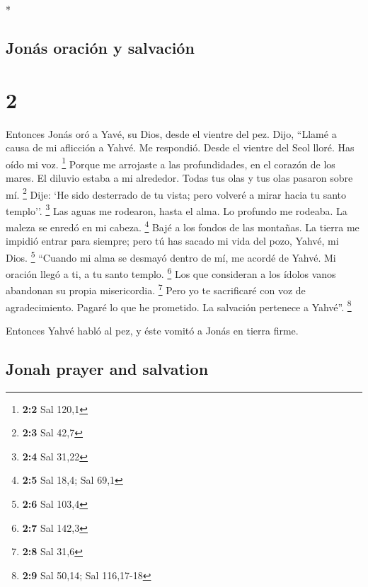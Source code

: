 \begin{paracol}{2}
\begin{otherlanguage}{english}
\end{otherlanguage}

\switchcolumn[0]*

\hypertarget{jonuxe1s-oraciuxf3n-y-salvaciuxf3n}{%
\subsection{Jonás oración y
salvación}\label{jonuxe1s-oraciuxf3n-y-salvaciuxf3n}}

\hypertarget{section-2}{%
\section{2}\label{section-2}}

 Entonces Jonás oró a Yavé, su Dios, desde el vientre del
pez.  Dijo, ``Llamé a causa de mi aflicción a Yahvé. Me
respondió. Desde el vientre del Seol lloré. Has oído mi voz. \footnote{\textbf{2:2}
  Sal 120,1}  Porque me arrojaste a las profundidades, en
el corazón de los mares. El diluvio estaba a mi alrededor. Todas tus
olas y tus olas pasaron sobre mí. \footnote{\textbf{2:3} Sal 42,7}
 Dije: `He sido desterrado de tu vista; pero volveré a
mirar hacia tu santo templo''. \footnote{\textbf{2:4} Sal 31,22}
 Las aguas me rodearon, hasta el alma. Lo profundo me
rodeaba. La maleza se enredó en mi cabeza. \footnote{\textbf{2:5} Sal
  18,4; Sal 69,1}  Bajé a los fondos de las montañas. La
tierra me impidió entrar para siempre; pero tú has sacado mi vida del
pozo, Yahvé, mi Dios. \footnote{\textbf{2:6} Sal 103,4} 
``Cuando mi alma se desmayó dentro de mí, me acordé de Yahvé. Mi oración
llegó a ti, a tu santo templo. \footnote{\textbf{2:7} Sal 142,3}
 Los que consideran a los ídolos vanos abandonan su propia
misericordia. \footnote{\textbf{2:8} Sal 31,6}  Pero yo te
sacrificaré con voz de agradecimiento. Pagaré lo que he prometido. La
salvación pertenece a Yahvé''. \footnote{\textbf{2:9} Sal 50,14; Sal
  116,17-18}

 Entonces Yahvé habló al pez, y éste vomitó a Jonás en
tierra firme.

\switchcolumn
\begin{otherlanguage}{english}

\hypertarget{jonah-prayer-and-salvation}{%
\subsection{Jonah prayer and
salvation}\label{jonah-prayer-and-salvation}}


\end{otherlanguage}
\end{paracol}
